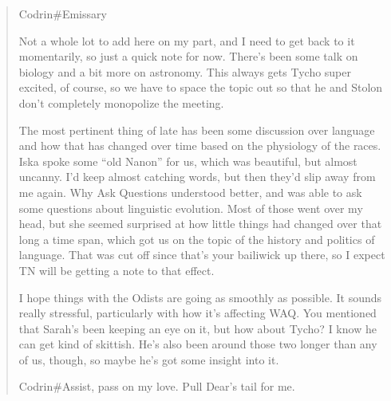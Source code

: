 \begin{quote}
Codrin\#Emissary

Not a whole lot to add here on my part, and I need to get back to it momentarily, so just a quick note for now. There's been some talk on biology and a bit more on astronomy. This always gets Tycho super excited, of course, so we have to space the topic out so that he and Stolon don't completely monopolize the meeting.

The most pertinent thing of late has been some discussion over language and how that has changed over time based on the physiology of the races. Iska spoke some ``old Nanon'' for us, which was beautiful, but almost uncanny. I'd keep almost catching words, but then they'd slip away from me again. Why Ask Questions understood better, and was able to ask some questions about linguistic evolution. Most of those went over my head, but she seemed surprised at how little things had changed over that long a time span, which got us on the topic of the history and politics of language. That was cut off since that's your bailiwick up there, so I expect TN will be getting a note to that effect.

I hope things with the Odists are going as smoothly as possible. It sounds really stressful, particularly with how it's affecting WAQ. You mentioned that Sarah's been keeping an eye on it, but how about Tycho? I know he can get kind of skittish. He's also been around those two longer than any of us, though, so maybe he's got some insight into it.

Codrin\#Assist, pass on my love. Pull Dear's tail for me.
\end{quote}
